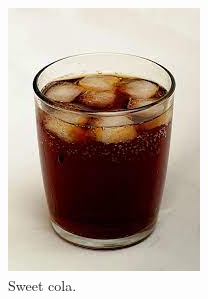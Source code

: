 \documentclass{article}
\begin{document}
\begin{figure}[h!]
\begin{subfigure}[b]{0.2\linewidth}
        	\includegraphics[width=\linewidth]{drink.jpg}
        	\caption{Sweet cola.}
        \end{subfigure}
         \begin{subfigure}[b]{0.5\linewidth}

\end{subfigure}
\end{figure}
\end{document}
